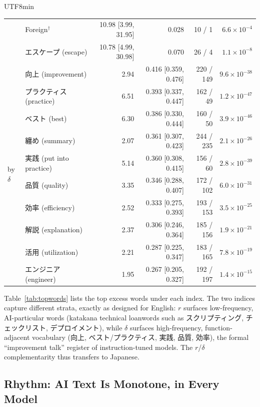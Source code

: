 \documentclass[11pt,a4paper]{article}
\begin{document}
\begin{CJK}{UTF8}{min}
\begin{table}[H]
\begin{tabular}{llrrrr}
 & Foreign$^\dagger$ & 10.98 [3.99, 31.95] & 0.028 & 10 / 1 & $6.6\times10^{-4}$ \\
 & エスケープ (escape) & 10.78 [4.99, 30.98] & 0.070 & 26 / 4 & $1.1\times10^{-8}$ \\
\midrule
\multirow{10}{*}{by $\delta$}
 & 向上 (improvement) & 2.94 & 0.416 [0.359, 0.476] & 220 / 149 & $9.6\times10^{-38}$ \\
 & プラクティス (practice) & 6.51 & 0.393 [0.337, 0.447] & 162 / 49 & $1.2\times10^{-47}$ \\
 & ベスト (best) & 6.30 & 0.386 [0.330, 0.444] & 160 / 50 & $3.9\times10^{-46}$ \\
 & 纏め (summary) & 2.07 & 0.361 [0.307, 0.423] & 244 / 235 & $2.1\times10^{-26}$ \\
 & 実践 (put into practice) & 5.14 & 0.360 [0.308, 0.415] & 156 / 60 & $2.8\times10^{-39}$ \\
 & 品質 (quality) & 3.35 & 0.346 [0.288, 0.407] & 172 / 102 & $6.0\times10^{-31}$ \\
 & 効率 (efficiency) & 2.52 & 0.333 [0.275, 0.393] & 193 / 153 & $3.5\times10^{-25}$ \\
 & 解説 (explanation) & 2.37 & 0.306 [0.246, 0.364] & 185 / 156 & $1.9\times10^{-21}$ \\
 & 活用 (utilization) & 2.21 & 0.287 [0.225, 0.347] & 183 / 165 & $7.8\times10^{-19}$ \\
 & エンジニア (engineer) & 1.95 & 0.267 [0.205, 0.327] & 192 / 197 & $1.4\times10^{-15}$ \\
\bottomrule
\end{tabular}
\end{table}

Table~\ref{tab:topwords} lists the top excess words under each index. The two indices capture different strata, exactly as \citet{kobak2025excess} designed for English: $r$ surfaces low-frequency, AI-particular words (katakana technical loanwords such as スクリプティング, チェックリスト, デプロイメント), while $\delta$ surfaces high-frequency, function-adjacent vocabulary (向上, ベスト/プラクティス, 実践, 品質, 効率), the formal ``improvement talk'' register of instruction-tuned models. The $r$/$\delta$ complementarity thus transfers to Japanese.

\subsection{Rhythm: AI Text Is Monotone, in Every Model}
\label{sec:rhythmresults}


\end{CJK}
\end{document}
